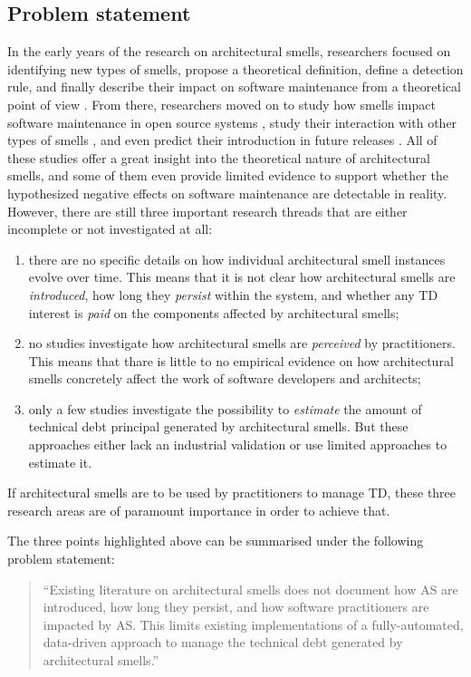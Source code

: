 \subsection{Problem statement}
In the early years of the research on architectural smells, researchers focused on identifying new types of smells, propose a  theoretical definition, define a detection rule, and finally describe their impact on software maintenance from a theoretical point of view \cite{Lippert2006,Garcia2009,Mo2015,Le2016,Arcelli2016}.
From there, researchers moved on to study how smells impact software maintenance in open source systems \cite{Choudhary2016,Xiao2016,Le2018}, study their interaction with other types of smells \cite{Sharma2017,Arcelli2019}, and even predict their introduction in future releases \cite{Arcelli2019b}.
All of these studies offer a great insight into the theoretical nature of architectural smells, and some of them even provide limited evidence to support whether the hypothesized negative effects on software maintenance are detectable in reality.
However, there are still three important research threads that are either incomplete or not investigated at all:
\begin{enumerate}
    \item there are no specific details on how individual architectural smell instances evolve over time. This means that it is not clear how architectural smells are \emph{introduced}, how long they \emph{persist} within the system, and whether any TD interest is \emph{paid} on the components affected by architectural smells; 
    \item no studies investigate how architectural smells are \emph{perceived} by practitioners. This means that thare is little to no empirical evidence on how architectural smells concretely affect the work of software developers and architects;
    \item only a few studies investigate the possibility to \emph{estimate} the amount of technical debt principal generated by architectural smells. But these approaches either lack an industrial validation or use limited approaches to estimate it. 
\end{enumerate}
If architectural smells are to be used by practitioners to manage TD, these three research areas are of paramount importance in order to achieve that.

The three points highlighted above can be summarised under the following problem statement:
\begin{quote}
    ``Existing literature on architectural smells does not document how AS are introduced, how long they persist, and how software practitioners are impacted by AS. 
    This limits existing implementations of a fully-automated, data-driven approach to manage the technical debt generated by architectural smells.''
\end{quote}


